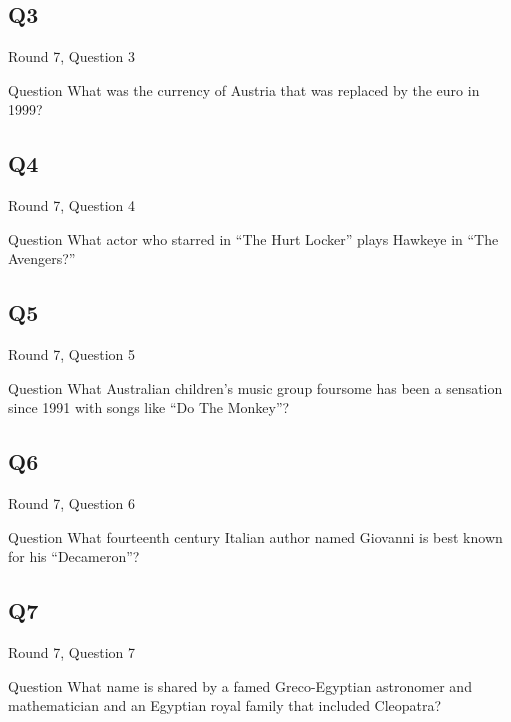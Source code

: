 \documentclass[11pt]{beamer}
\begin{document}
\subsection*{Q3}
\begin{frame}[t]{Round 7, Question 3}
\vspace{2em}
\begin{block}{Question}
What was the currency of Austria that was replaced by the euro in 1999\@?
\end{block}
\end{frame}
    

\subsection*{Q4}
\begin{frame}[t]{Round 7, Question 4}
\vspace{2em}
\begin{block}{Question}
What actor who starred in ``The Hurt Locker'' plays Hawkeye in ``The Avengers?''
\end{block}
\end{frame}
    

\subsection*{Q5}
\begin{frame}[t]{Round 7, Question 5}
\vspace{2em}
\begin{block}{Question}
What Australian children's music group foursome has been a sensation since 1991 with songs like ``Do The Monkey''\@?
\end{block}
\end{frame}
    

\subsection*{Q6}
\begin{frame}[t]{Round 7, Question 6}
\vspace{2em}
\begin{block}{Question}
What fourteenth century Italian author named Giovanni is best known for his ``Decameron''\@?
\end{block}
\end{frame}
    

\subsection*{Q7}
\begin{frame}[t]{Round 7, Question 7}
\vspace{2em}
\begin{block}{Question}
What name is shared by a famed Greco-Egyptian astronomer and mathematician and an Egyptian royal family that included Cleopatra\@?
\end{block}
\end{frame}
    
\end{document}
